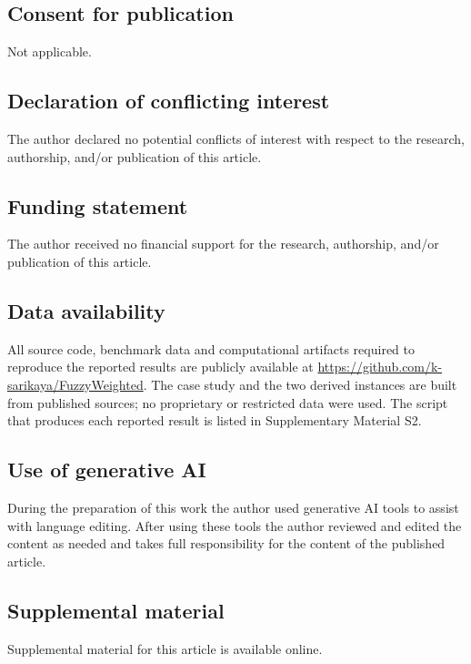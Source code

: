 \documentclass[Review,sagev,times]{sagej}%
\begin{document}
\subsection*{Consent for publication}
Not applicable.

\subsection*{Declaration of conflicting interest}
The author declared no potential conflicts of interest with respect to the research, authorship, and/or
publication of this article.

\subsection*{Funding statement}
The author received no financial support for the research, authorship, and/or publication of this article.

\subsection*{Data availability}
All source code, benchmark data and computational artifacts required to reproduce the reported results are
publicly available at \url{https://github.com/k-sarikaya/FuzzyWeighted}. The case study and the two derived
instances are built from published sources\cite{IEEERTS1979,Fyffe1968,Garg2013}; no proprietary or restricted
data were used. The script that produces each reported result is listed in Supplementary Material S2.

\subsection*{Use of generative AI}
During the preparation of this work the author used generative AI tools to assist with language
editing. After using these tools the author
reviewed and edited the content as needed and takes full responsibility for the content of the
published article.

\subsection*{Supplemental material}
Supplemental material for this article is available online.



\end{document}
